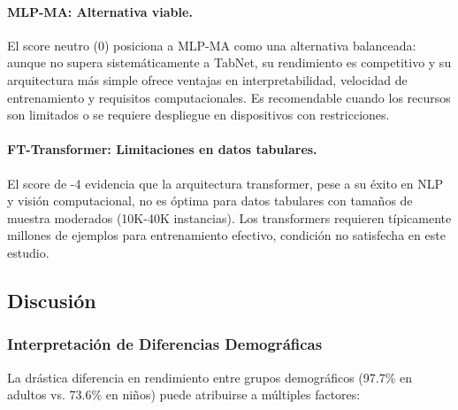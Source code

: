 \documentclass[12pt,a4paper]{article}
\begin{document}
\paragraph{MLP-MA: Alternativa viable.} El score neutro (0) posiciona a MLP-MA como una alternativa balanceada: aunque no supera sistemáticamente a TabNet, su rendimiento es competitivo y su arquitectura más simple ofrece ventajas en interpretabilidad, velocidad de entrenamiento y requisitos computacionales. Es recomendable cuando los recursos son limitados o se requiere despliegue en dispositivos con restricciones.

\paragraph{FT-Transformer: Limitaciones en datos tabulares.} El score de -4 evidencia que la arquitectura transformer, pese a su éxito en NLP y visión computacional, no es óptima para datos tabulares con tamaños de muestra moderados (10K-40K instancias). Los transformers requieren típicamente millones de ejemplos para entrenamiento efectivo, condición no satisfecha en este estudio.


\subsection{Discusión}

\subsubsection{Interpretación de Diferencias Demográficas}

La drástica diferencia en rendimiento entre grupos demográficos (97.7\% en adultos vs. 73.6\% en niños) puede atribuirse a múltiples factores:
\end{document}
